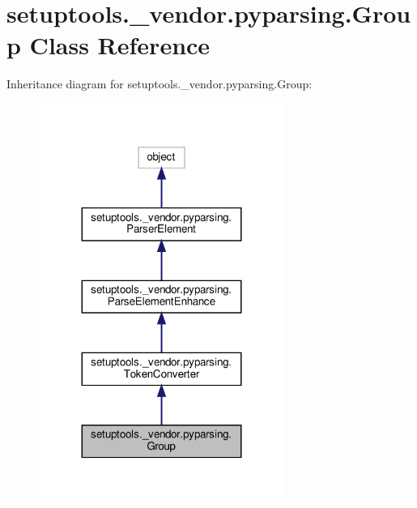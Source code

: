 \hypertarget{classsetuptools_1_1__vendor_1_1pyparsing_1_1Group}{}\section{setuptools.\+\_\+vendor.\+pyparsing.\+Group Class Reference}
\label{classsetuptools_1_1__vendor_1_1pyparsing_1_1Group}


Inheritance diagram for setuptools.\+\_\+vendor.\+pyparsing.\+Group\+:
\nopagebreak
\begin{figure}[H]
\begin{center}
\leavevmode
\includegraphics[width=227pt]{classsetuptools_1_1__vendor_1_1pyparsing_1_1Group__inherit__graph}
\end{center}
\end{figure}


